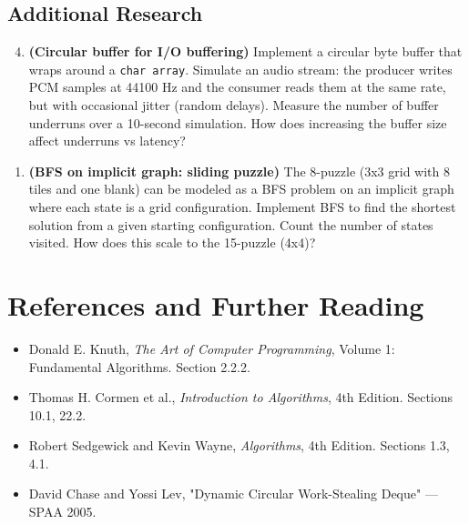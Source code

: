 \subsection{Additional Research}

\begin{enumerate}
\setcounter{enumi}{3}
\item \textbf{(Circular buffer for I/O buffering)} Implement a circular byte buffer that wraps around a \texttt{char array}. Simulate an audio stream: the producer writes PCM samples at 44100 Hz and the consumer reads them at the same rate, but with occasional jitter (random delays). Measure the number of buffer underruns over a 10-second simulation. How does increasing the buffer size affect underruns vs latency?
\end{enumerate}

\begin{enumerate}
\item \textbf{(BFS on implicit graph: sliding puzzle)} The 8-puzzle (3x3 grid with 8 tiles and one blank) can be modeled as a BFS problem on an implicit graph where each state is a grid configuration. Implement BFS to find the shortest solution from a given starting configuration. Count the number of states visited. How does this scale to the 15-puzzle (4x4)?
\end{enumerate}

\section{References and Further Reading}

\begin{itemize}
\item Donald E. Knuth, \textit{The Art of Computer Programming}, Volume 1: Fundamental Algorithms. Section 2.2.2.
\item Thomas H. Cormen et al., \textit{Introduction to Algorithms}, 4th Edition. Sections 10.1, 22.2.
\item Robert Sedgewick and Kevin Wayne, \textit{Algorithms}, 4th Edition. Sections 1.3, 4.1.
\item David Chase and Yossi Lev, "Dynamic Circular Work-Stealing Deque" — SPAA 2005.
\end{itemize}

